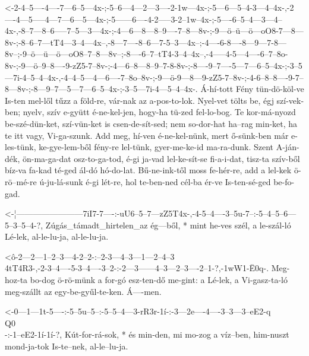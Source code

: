   {<-2-4--5----4----7---6--5---4x-;-5--6---4---2---3----2-1w---4x-;-5---6---5--4-3---4--4x-,-2----4---5-----4---7---6---5---4x-;-5------6----4-2-----3-2--1w--4x-;-5----6--5--4---3---4--4x-,-8--7---8--6-----7--5---3---4x-;-4---6---8---8--9----7--8---8v-;-9---ö--ü---ö---oO8-7---8---8v-;-8--6--7---tT4---3--4---4x--,-8---7----8--6---7-5--3---4x--;-4----6-8----8---9---7-8---8v--;-9--ö---ü---ö---oO8--7--8---8v--;-8----6--7--tT4-3--4--4x--,-4-----4-5---4----6--7--8o-8v-;-9---ö--9--8----9-zZ5-7--8v-;-4---6--8---8--9--7-8-8v-;-8----9--7----5---7---6--5--4x-;-3--5---7i-4--5--4--4x-,-4--4--5---4---6----7--8o--8v-;-9---ö-9---8---9-zZ5-7--8v-;-4-6--8--8----9-7--8---8v-;-8---9--7---5---7---6--5--4x-;-3--5---7i-4---5--4--4x-.}
  {  Á-hí-tott Fény tün-dö-köl-ve   Is-ten mel-lől tűzz a föld-re,  vár-nak az a-pos-to-lok. Nyel-vet tölts be, égj szí-vek-ben; nyelv, szív e-gyütt é-ne-kel-jen, hogy-ha tü-zed fel-lo-bog. Te kor-má-nyozd be-szé-dün-ket, szí-vün-ket is csen-de-sít-sed; nem so-dor-hat ha--rag min-ket, ha te itt vagy, Vi-ga-szunk. Add meg, hí-ven é-ne-kel-nünk, mert ő-sünk-ben már e-les-tünk, ke-gye-lem-ből fény-re lel-tünk, gyer-me-ke-id  ma-ra-dunk. Szent A-ján-dék, ön-ma-ga-dat  osz-to-ga-tod, é-gi  ja-vad  lel-ke-sít-se fi-a-i-dat, tisz-ta szív-ből bíz-va fa-kad  té-ged ál-dó hó-do-lat. Bű-ne-ink-től moss fe-hér-re,  add a lel-kek ö-rö--mé-re   ú-ju-lá-sunk é-gi lét-re,  hol te-ben-ned cél-ba ér-ve   Is-ten-sé-ged be-fo-gad.}

  {<-¦------------------------7iI7-7----:-uU6--5--7---zZ5T4x-,-4-5--4----3--5u-7--:-5--4--5--6---5--3--5--4-?,}
  {  Zúgás_támadt_hirtelen_az ég---ből, * mint he-ves szél,    a le-szál-ló Lé-lek, al-le-lu-ja, al-le-lu-ja.}


  {<ô-2---2---1--2--3---4-2--2-:--2-3---4--3---1---2--4--3\\4tT4R3-,-2-3--4----5-3--4----3--2-:-2---3------4--3---2--3----2--1-?,-1wW1-Ë0q-.}
  {   Meg-hoz-ta bo-dog ö-rö-münk a for-gó esz-ten-dő me-gint:       a Lé-lek, a Vi-gasz-ta-ló  meg-szállt az egy-be-gyűl-te-ken. Á----men.}

  {<-0---1---1t-5----:-5--5u--5--:-5--5--4---3-rR3r-1í-:-3---2e----4----3--3---3--eE2-q\\Q0\\-:-1--eE2-1í-1í-?,}
  {  Kút-for-rá-sok, * és min-den, mi mo-zog a víz--ben, him-nuszt mond-ja-tok Is-te--nek,      al-le--lu-ja.}

